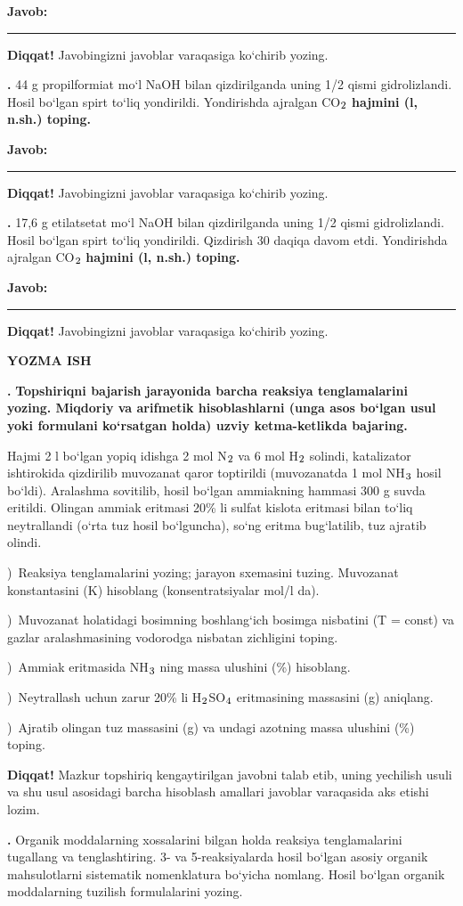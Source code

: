 \documentclass[11pt,a4paper]{article}
\renewcommand{\textsubscript}[1]{\ensuremath{_{\text{\fontsize{8}{8}\selectfont #1}}}}
\newcommand{\qn}[1]{\textbf{\fontsize{11.5}{13}\selectfont #1}}
\newcommand{\qsep}{\par\vspace{13pt}}
\newcommand{\diqqat}[1]{\par\smallskip\noindent\textbf{Diqqat!} #1\par\medskip}
\newcommand{\javob}{\par\nopagebreak[4]\smallskip\noindent\textbf{Javob:} \rule[-2pt]{7.5cm}{0.4pt}\par\smallskip\noindent\textbf{Diqqat!} Javobingizni javoblar varaqasiga ko`chirib yozing.\par\medskip}
\begin{document}
\javob\qsep
\noindent\qn{39.} 44 g propilformiat mo`l NaOH bilan qizdirilganda uning 1/2 qismi gidrolizlandi. Hosil bo`lgan spirt to`liq yondirildi. Yondirishda ajralgan CO\textsubscript{2} \textbf{hajmini (l, n.sh.) toping.}
\javob\qsep
\noindent\qn{40.} 17,6 g etilatsetat mo`l NaOH bilan qizdirilganda uning 1/2 qismi gidrolizlandi. Hosil bo`lgan spirt to`liq yondirildi. Qizdirish 30 daqiqa davom etdi. Yondirishda ajralgan CO\textsubscript{2} \textbf{hajmini (l, n.sh.) toping.}
\javob\qsep
\par\bigskip\begin{center}\textbf{\fontsize{13}{15}\selectfont YOZMA ISH}\end{center}
\noindent\qn{41.} \textbf{Topshiriqni bajarish jarayonida barcha reaksiya tenglamalarini yozing. Miqdoriy va arifmetik hisoblashlarni (unga asos bo`lgan usul yoki formulani ko`rsatgan holda) uzviy ketma-ketlikda bajaring.}\par\smallskip
Hajmi 2 l bo`lgan yopiq idishga 2 mol N\textsubscript{2} va 6 mol H\textsubscript{2} solindi, katalizator ishtirokida qizdirilib muvozanat qaror toptirildi (muvozanatda 1 mol NH\textsubscript{3} hosil bo`ldi). Aralashma sovitilib, hosil bo`lgan ammiakning hammasi 300 g suvda eritildi. Olingan ammiak eritmasi 20\% li sulfat kislota eritmasi bilan to`liq neytrallandi (o`rta tuz hosil bo`lguncha), so`ng eritma bug`latilib, tuz ajratib olindi.\par
{})\ Reaksiya tenglamalarini yozing; jarayon sxemasini tuzing. Muvozanat konstantasini (K) hisoblang (konsentratsiyalar mol/l da).\par
{})\ Muvozanat holatidagi bosimning boshlang`ich bosimga nisbatini (T = const) va gazlar aralashmasining vodorodga nisbatan zichligini toping.\par
{})\ Ammiak eritmasida NH\textsubscript{3} ning massa ulushini (\%) hisoblang.\par
{})\ Neytrallash uchun zarur 20\% li H\textsubscript{2}SO\textsubscript{4} eritmasining massasini (g) aniqlang.\par
{})\ Ajratib olingan tuz massasini (g) va undagi azotning massa ulushini (\%) toping.\par
\diqqat{Mazkur topshiriq kengaytirilgan javobni talab etib, uning yechilish usuli va shu usul asosidagi barcha hisoblash amallari javoblar varaqasida aks etishi lozim.}\qsep
\noindent\qn{42.} Organik moddalarning xossalarini bilgan holda reaksiya tenglamalarini tugallang va tenglashtiring. 3- va 5-reaksiyalarda hosil bo`lgan asosiy organik mahsulotlarni sistematik nomenklatura bo`yicha nomlang. Hosil bo`lgan organik moddalarning tuzilish formulalarini yozing.\par
\end{document}
